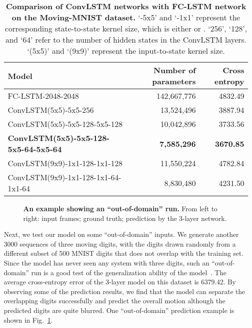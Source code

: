 \documentclass{article} \usepackage{amsmath}
\begin{document}
\begin{table}[!tb]
\caption{\textbf{Comparison of ConvLSTM networks with FC-LSTM network on the Moving-MNIST dataset.} `-5x5' and `-1x1' represent the corresponding state-to-state kernel size, which is either  or . `256', `128', and `64' refer to the number of hidden states in the ConvLSTM layers. `(5x5)' and `(9x9)' represent the input-to-state kernel size.}
\begin{center}
\begin{tabular}{|l|r|r|}

\hline
Model & Number of parameters & Cross entropy\\
\hline
\hline
FC-LSTM-2048-2048 & 142,667,776 & 4832.49 \\
\hline
ConvLSTM(5x5)-5x5-256 & 13,524,496 & 3887.94\\
ConvLSTM(5x5)-5x5-128-5x5-128 & 10,042,896 & 3733.56\\
\textbf{ConvLSTM(5x5)-5x5-128-5x5-64-5x5-64} & \textbf{7,585,296} & \textbf{3670.85}\\
\hline
ConvLSTM(9x9)-1x1-128-1x1-128 & 11,550,224 & 4782.84\\
ConvLSTM(9x9)-1x1-128-1x1-64-1x1-64 & 8,830,480 & 4231.50\\
\hline
\end{tabular}
\vspace{-0.5em}
\end{center}
\label{tbl:movingmnist-result}
\end{table}

\begin{figure}[!tb]
\centering
{}\vspace{-1em}
    \vspace{-1em}
    \vspace{-2em}
    \caption{\textbf{An example showing an ``out-of-domain'' run.} From left to right: input frames; ground truth; prediction by the 3-layer network.}
    \label{fig:movingmnist-outdomain}
    \vspace{-1em}
\end{figure}
Next, we test our model on some ``out-of-domain'' inputs. We generate another 3000 sequences of three moving digits, with the digits drawn randomly from a different subset of 500 MNIST digits that does not overlap with the training set. Since the model has never seen any system with three digits, such an ``out-of-domain'' run is a good test of the generalization ability of the model~\cite{srivastava2015unsupervised}. The average cross-entropy error of the 3-layer model on this dataset is 6379.42. By observing some of the prediction results, we find that the model can separate the overlapping digits successfully and predict the overall motion although the predicted digits are quite blurred. One ``out-of-domain'' prediction example is shown in Fig.~\ref{fig:movingmnist-outdomain}.
\end{document}
